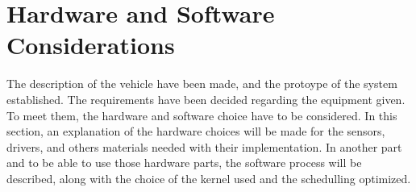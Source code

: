 \chapter{Hardware and Software\\ Considerations}

The description of the vehicle have been made, and the protoype of the system established. The requirements have been decided regarding the equipment given. To meet them, the hardware and software choice have to be considered. In this section, an explanation of the hardware choices will be made for the sensors, drivers, and others materials needed with their implementation. In another part and to be able to use those hardware parts, the software process will be described, along with the choice of the kernel used and the schedulling optimized.
